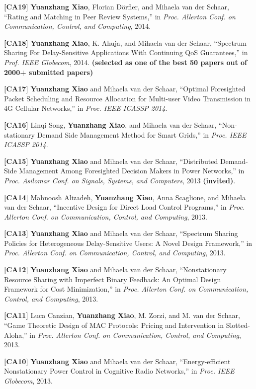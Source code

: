 \documentclass[margin,line]{res}
\begin{document}
\begin{resume}
\textbf{[CA19]} {\bf Yuanzhang Xiao}, Florian D\"{o}rfler, and Mihaela van der Schaar, ``Rating and Matching in Peer Review Systems,'' in \emph{Proc. Allerton Conf. on Communication, Control, and Computing}, 2014.

\textbf{[CA18]} {\bf Yuanzhang Xiao}, K. Ahuja, and Mihaela van der Schaar, ``Spectrum Sharing For Delay-Sensitive Applications With Continuing QoS Guarantees,'' in \emph{Prof. IEEE Globecom}, 2014. {\bf (selected as one of the best 50 papers out of 2000+ submitted papers)}

\textbf{[CA17]} {\bf Yuanzhang Xiao} and Mihaela van der Schaar, ``Optimal Foresighted Packet Scheduling and Resource Allocation for Multi-user Video Transmission in 4G Cellular Networks,'' in \emph{Proc. IEEE ICASSP 2014}.

\textbf{[CA16]} Linqi Song, {\bf Yuanzhang Xiao}, and Mihaela van der Schaar, ``Non-stationary Demand Side Management Method for Smart Grids,'' in \emph{Proc. IEEE ICASSP 2014}.

\textbf{[CA15]} {\bf Yuanzhang Xiao} and Mihaela van der Schaar, ``Distributed Demand-Side Management Among Foresighted Decision Makers in Power
Networks,'' in \emph{Proc. Asilomar Conf. on Signals, Systems, and Computers}, 2013 {\bf (invited)}.

\textbf{[CA14]}  Mahnoosh Alizadeh, {\bf Yuanzhang Xiao}, Anna Scaglione, and Mihaela van der Schaar, ``Incentive Design for Direct Load Control Programs,'' in \emph{Proc. Allerton Conf. on Communication, Control, and Computing}, 2013.

\textbf{[CA13]} {\bf Yuanzhang Xiao} and Mihaela van der Schaar, ``Spectrum Sharing Policies for Heterogeneous Delay-Sensitive Users: A Novel Design
Framework,'' in \emph{Proc. Allerton Conf. on Communication, Control, and Computing}, 2013.

\textbf{[CA12]} {\bf Yuanzhang Xiao} and Mihaela van der Schaar, ``Nonstationary Resource Sharing with Imperfect Binary Feedback: An Optimal Design
Framework for Cost Minimization,'' in \emph{Proc. Allerton Conf. on Communication, Control, and Computing}, 2013.

\textbf{[CA11]} Luca Canzian, {\bf Yuanzhang Xiao}, M. Zorzi, and M. van der Schaar, ``Game Theoretic Design of MAC Protocols: Pricing and
Intervention in Slotted-Aloha,'' in \emph{Proc. Allerton Conf. on Communication, Control, and Computing}, 2013.

\textbf{[CA10]} {\bf Yuanzhang Xiao} and Mihaela van der Schaar, ``Energy-efficient Nonstationary Power Control in Cognitive Radio Networks,'' in
\emph{Proc. IEEE Globecom}, 2013.


\end{resume}
\end{document}
